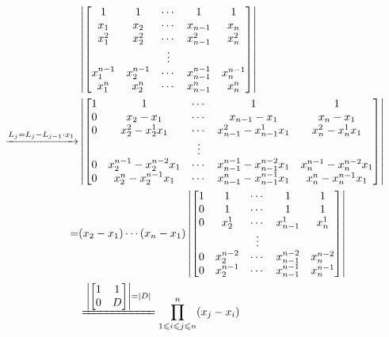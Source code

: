 \documentclass[UTF8]{../09-Mathematics}
\begin{document}
  \begin{equation}
    \begin{aligned}
        &
        \left|
        \begin{bmatrix}
            1 & 1 & \cdots & 1 & 1\\
            x_1 & x_2 & \cdots & x_{n-1} & x_n\\
            x_{1}^2 & x_{2}^2 & \cdots & x_{n-1}^2 & x_{n}^2\\
            &  & \vdots &  & \\
            x_{1}^{n-1} & x_{2}^{n-1} & \cdots & x_{n-1}^{n-1} & x_{n}^{n-1}\\
            x_{1}^{n} & x_{2}^{n} & \cdots & x_{n-1}^{n} & x_{n}^{n}\\
        \end{bmatrix}
        \right|
        \\
        \xrightarrow[]{L_j = L_j - L_{j-1} \cdot x_1}
        &
        \left|
        \begin{bmatrix}
        1 & 1 & \cdots & 1 & 1\\
        0 & x_2-x_1 & \cdots & x_{n-1} -x_1& x_n-x_1\\
        0 & x_{2}^2-x_{2}^1 x_1  & \cdots & x_{n-1}^2-x_{n-1}^1 x_1 & x_{n}^2-x_{n}^1 x_1\\
        &  & \vdots &  & \\
        0 & x_{2}^{n-1}-x_{2}^{n-2}x_1   & \cdots & x_{n-1}^{n-1} -x_{n-1}^{n-2}x_1 & x_{n}^{n-1}-x_{n}^{n-2}x_1 \\
        0 & x_{2}^{n}-x_{2}^{n-1} x_1 & \cdots & x_{n-1}^{n}-x_{n-1}^{n-1} x_1 & x_{n}^{n}-x_{n}^{n-1}x_1 \\
        \end{bmatrix}
        \right|
        \\
        =&
        (x_2-x_1) \cdots (x_n-x_1)
        \left|
        \begin{bmatrix}
           1 & 1 & \cdots & 1 & 1\\
           0 & 1 & \cdots & 1& 1\\
           0 & x_{2}^1  & \cdots & x_{n-1}^1 & x_{n}^1\\
           &  & \vdots &  & \\
           0 & x_{2}^{n-2}   & \cdots & x_{n-1}^{n-2} & x_{n}^{n-2} \\
           0 & x_{2}^{n-1} & \cdots & x_{n-1}^{n-1}  & x_{n}^{n-1} \\
        \end{bmatrix}
        \right|
        \\
        &
        \xlongequal[]{\left|
            \begin{bmatrix}
               1 & 1 \\
               0 & D \\
            \end{bmatrix}
        \right| = |D|}
        \prod_{1\leqslant i \leqslant j \leqslant n}^{n} (x_j-x_i)
    \end{aligned}
\end{equation}
\end{document}
